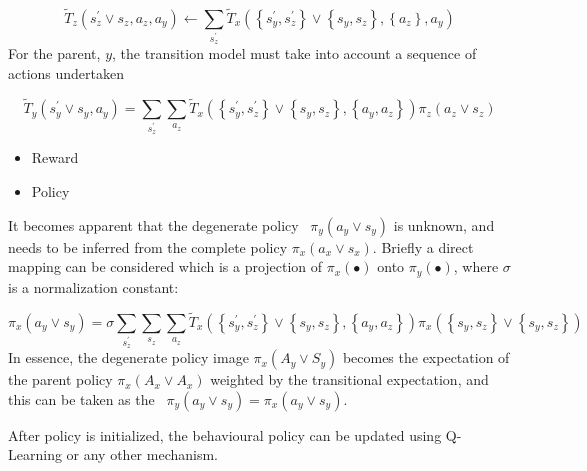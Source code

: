 \documentclass{article}
\begin{document}
\begin{equation}
\widetilde T_z\left(s_z^'\vee s_z^{},a_z,a_y\right)\leftarrow \sum _{s_z^'}^{}\widetilde T_x\left(\left\{s_y^',s_z^'\right\}\vee \left\{s_y^{},s_z^{}\right\},\left\{a_z\right\},a_y\right)
\end{equation}
For the parent,  $y$, the transition model must take into account a sequence of actions undertaken 

\begin{equation}
\widetilde T_y\left(s_y^'\vee s_y^{},a_y\right)=\sum _{s_z^'}^{}\sum _{a_z}^{}\widetilde T_x\left(\left\{s_y^',s_z^'\right\}\vee \left\{s_y^{},s_z^{}\right\},\left\{a_y,a_z\right\}\right)\pi _z\left(a_z\vee s_z\right)
\end{equation}


\begin{itemize}
\item Reward
\end{itemize}

\bigskip

\begin{itemize}
\item Policy
\end{itemize}
It becomes apparent that the degenerate policy \  $\pi _y\left(a_y\vee s_y\right)$ is unknown, and needs to be inferred from the complete policy  $\pi _x\left(a_x\vee s_x\right)$. Briefly a direct mapping can be considered which is a projection of  $\pi _x\left({\bullet}\right)$ onto  $\pi _y\left({\bullet}\right)$, where  $\sigma $ is a normalization constant:

\begin{equation}
\pi _x\left(a_y\vee s_y\right)=\sigma \sum _{s_z^'}^{}\sum _{s_z}^{}\sum _{a_z}^{}\widetilde T_x\left(\left\{s_y^',s_z^'\right\}\vee \left\{s_y^{},s_z^{}\right\},\left\{a_y,a_z\right\}\right)\pi _x\left(\left\{s_y^{},s_z^{}\right\}\vee \left\{s_y^{},s_z^{}\right\}\right)
\end{equation}
In essence, the degenerate policy image  $\pi _x\left(A_y\vee S_y\right)$ becomes the expectation of the parent policy  $\pi _x\left(A_x\vee A_x\right)$ weighted by the transitional expectation, and this can be taken as the \  $\pi _y\left(a_y\vee s_y\right)=\pi _x\left(a_y\vee s_y\right)$.

After policy is initialized, the behavioural policy can be updated using Q-Learning or any other mechanism.
\end{document}
